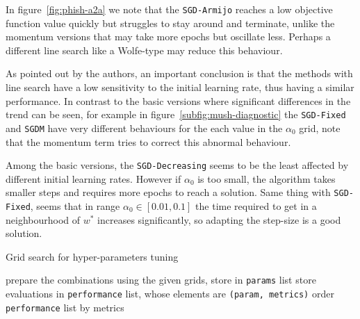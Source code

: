 In figure~\ref{fig:phish-a2a} we note that the \texttt{SGD-Armijo} reaches a low objective function value quickly but struggles to stay around and terminate, unlike the momentum versions that may take more epochs but oscillate less. Perhaps a different line search like a Wolfe-type may reduce this behaviour.

As pointed out by the authors, an important conclusion is that the methods with line search have a low sensitivity to the initial learning rate, thus having a similar performance. In contrast to the basic versions where significant differences in the trend can be seen, for example in figure~\ref{subfig:mush-diagnostic} the \texttt{SGD-Fixed} and \texttt{SGDM} have very different behaviours for the each value in the $\alpha_0$ grid, note that the momentum term tries to correct this abnormal behaviour.

Among the basic versions, the \texttt{SGD-Decreasing} seems to be the least affected by different initial learning rates. However if $\alpha_0$ is too small, the algorithm takes smaller steps and requires more epochs to reach a solution. Same thing with \texttt{SGD-Fixed}, seems that in range $\alpha_0\in[0.01,0.1]$ the time required to get in a neighbourhood of $w^\ast$ increases significantly, so adapting the step-size is a good solution.


\begin{algorithm}
\caption{Grid search for hyper-parameters tuning}\label{alg:grid-search}
prepare the combinations using the given grids, store in \texttt{params} list\;
store evaluations in \texttt{performance} list, whose elements are \texttt{(param, metrics)}\;
order \texttt{performance} list by metrics\;
\end{algorithm}


